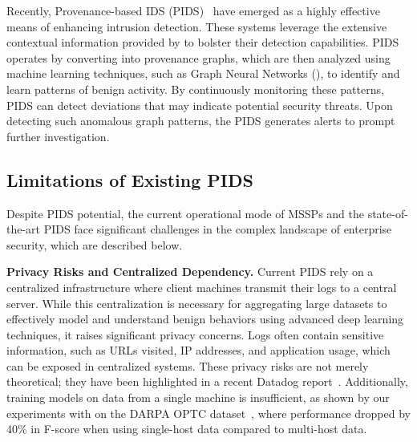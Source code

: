 Recently, Provenance-based IDS (PIDS)~\cite{streamspot,provdetector2020,wang2022threatrace,shadewatcher,yangprographer,han2020unicorn,jia2023magic,flash2024,cheng2023kairos,sigl} have emerged as a highly effective means of enhancing intrusion detection. These systems leverage the extensive contextual information provided by \logs to bolster their detection capabilities. PIDS operates by converting \logs into provenance graphs, which are then analyzed using machine learning techniques, such as Graph Neural Networks (\gnnshort), to identify and learn patterns of benign activity. By continuously monitoring these patterns, PIDS can detect deviations that may indicate potential security threats. Upon detecting such anomalous graph patterns, the PIDS generates alerts to prompt further investigation.


\subsection{Limitations of Existing PIDS}

Despite PIDS potential, the current operational mode of MSSPs and the state-of-the-art PIDS face significant challenges in the complex landscape of enterprise security, which are described below.

\smallskip
\noindent
\textbf{Privacy Risks and Centralized Dependency.} Current PIDS rely on a centralized infrastructure where client machines transmit their logs to a central server. While this centralization is necessary for aggregating large datasets to effectively model and understand benign behaviors using advanced deep learning techniques, it raises significant privacy concerns. Logs often contain sensitive information, such as URLs visited, IP addresses, and application usage, which can be exposed in centralized systems. These privacy risks are not merely theoretical; they have been highlighted in a recent Datadog report~\cite{datadog}. Additionally, training models on data from a single machine is insufficient, as shown by our experiments with \flash on the DARPA OPTC dataset~\cite{darpaoptc}, where performance dropped by 40\% in F-score when using single-host data compared to multi-host data.

